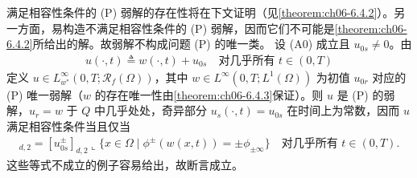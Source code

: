\documentclass[../../main.tex]{subfiles}%
\begin{document}
\begin{remark}\label{remark:ch06-6.3.2}
满足相容性条件的 (P) 弱解的存在性将在下文证明（见\cref{theorem:ch06-6.4.2}）。另一方面，易构造不满足相容性条件的 (P) 弱解，因而它们不可能是\cref{theorem:ch06-6.4.2}所给出的解。故弱解不构成问题 (P) 的唯一类。
设 (A0) 成立且 $u_{0s}\neq0$。由
\begin{align}
u(\cdot,t)\triangleq w(\cdot,t)+u_{0s} \quad\text{对几乎所有 }t\in(0,T) \label{align:ch6-6.22}
\end{align}
定义 $u\in L^\infty_{w^*}(0,T;\mathscr{R}_f(\Omega))$，其中 $w\in L^\infty(0,T;L^1(\Omega))$ 为初值 $u_{0r}$ 对应的 (P) 唯一弱解（$w$ 的存在唯一性由\cref{theorem:ch06-6.4.3}保证）。则 $u$ 是 (P) 的弱解，$u_r=w$ 于 $Q$ 中几乎处处，奇异部分 $u_s(\cdot,t)=u_{0s}$ 在时间上为常数，因而 $u$ 满足相容性条件当且仅当
\begin{align*}
[u^\pm_{0s}]_{d,2}=[u^\pm_{0s}]_{d,2}\llcorner\{x\in\Omega\mid\phi^\pm(w(x,t))=\pm\phi_{\pm\infty}\}
\quad\text{对几乎所有 }t\in(0,T).
\end{align*}
这些等式不成立的例子容易给出，故断言成立。
\end{remark}
\end{document}
